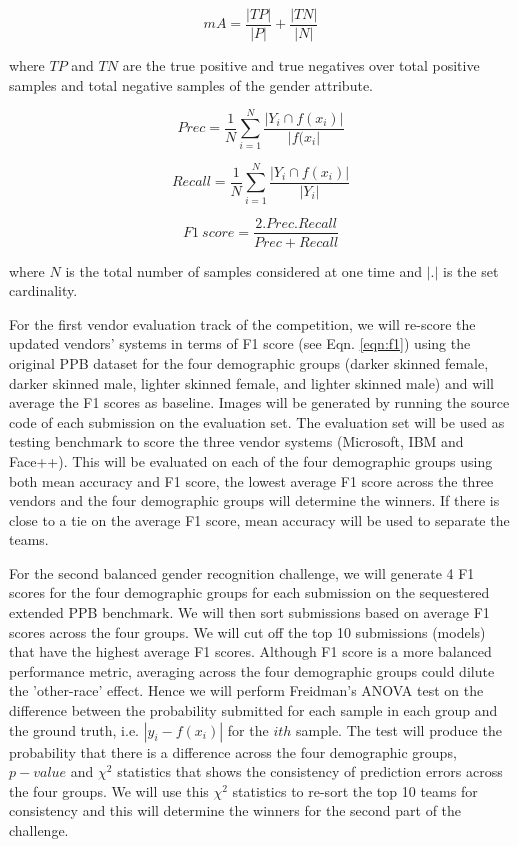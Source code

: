 \documentclass[11pt, oneside]{article}
\begin{document}
\begin{equation}
\label{eqn:ma}
mA =   \frac{|TP|}{|P|} + \frac{|TN|}{|N|}
\end{equation}

where $TP$ and $TN$ are the true positive and true negatives over total 
positive samples and total negative samples of the gender attribute.

\begin{equation}
\label{eqn:prec}
Prec =  \frac{1}{N}  \sum_{i=1}^{N}   \frac{|Y_{i} \cap f(x_{i}) |}{|f(x_{i}|}
\end{equation}

\begin{equation}
\label{eqn:rec}
Recall =  \frac{1}{N}  \sum_{i=1}^{N}   \frac{|Y_{i} \cap f(x_{i}) |}{|Y_{i}|}
\end{equation}

\begin{equation}
\label{eqn:f1}
F1\ score =  \frac{2.Prec.Recall}{Prec+Recall}
\end{equation}

where $N$ is the total number of samples considered at one time and $|.|$ is 
the set cardinality.

For the first vendor evaluation track of the competition, we will re-score the 
updated vendors' systems in terms of F1 score (see Eqn. \ref{eqn:f1}) using the 
original PPB dataset for the four demographic groups (darker skinned female, darker 
skinned male, lighter skinned female, and lighter skinned male) and will average the F1 
scores as baseline. Images will be generated by running the source code of each 
submission on the evaluation set.  The evaluation set will be used as testing 
benchmark to score the three vendor systems (Microsoft, IBM and Face++).  This 
will be evaluated on each of the four demographic groups using both mean 
accuracy and F1 score, the lowest average F1 score across the three vendors and 
the four demographic groups will determine the winners. If there is close to a 
tie on the average F1 score, mean accuracy will be used to separate the teams.

For the second balanced gender recognition challenge, we will generate 4 F1 
scores for the four demographic groups for each submission on the sequestered 
extended PPB benchmark. We will then sort submissions based on average F1 
scores across the four groups. We will cut off the top 10 submissions (models) 
that have the highest average F1 scores. Although F1 score is a more balanced 
performance metric, averaging across the four demographic groups could dilute 
the 'other-race' effect. Hence we will perform Freidman's ANOVA test on the 
difference between the probability submitted for each sample in each group and 
the ground truth, i.e. $|y_{i} - f(x_{i})|$ for the $ith$ sample. The test will 
produce the probability that there is a difference across the four demographic 
groups, $p-value$ and $\chi^{2}$ statistics that shows the consistency of 
prediction errors across the four groups. We will use this $\chi^{2}$ 
statistics to re-sort the top 10 teams for consistency and this will determine 
the winners for the second part of the challenge.
\end{document}
